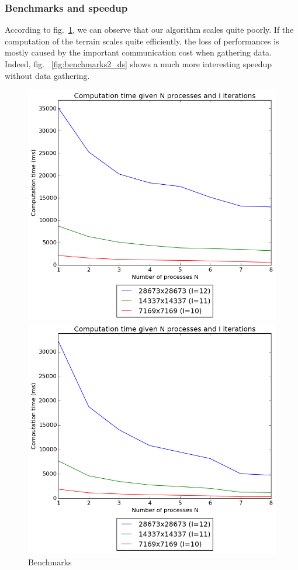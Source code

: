 \subsubsection{Benchmarks and speedup}
According to fig.~\ref{fig:benchmarks_ds}, we can observe that our algorithm scales quite poorly. If the computation of the terrain scales quite efficiently, the loss of performances is mostly caused by the important communication cost when gathering data. Indeed, fig.~ \ref{fig:benchmarks2_ds} shows a much more interesting speedup without data gathering.

\begin{figure}[!htb]
    \centering
    \includegraphics[width=\linewidth]{img/ds_benchmarks1.png}
    \caption{Benchmarks}
    \label{fig:benchmarks_ds}
\endminipage\hfill
{}
    \centering
    \includegraphics[width=\linewidth]{img/ds_benchmarks2.png}

\end{figure}
